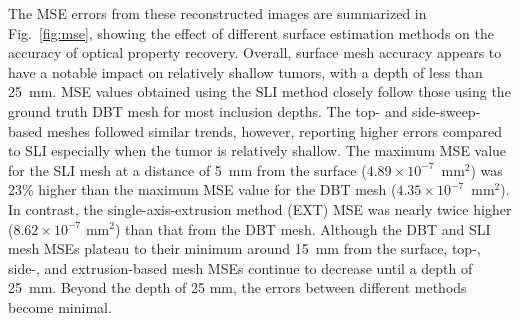 The \ac{MSE} errors from these reconstructed images are summarized in Fig.~\ref{fig:mse}, showing the effect of different surface estimation methods on the accuracy of optical property recovery. Overall, surface mesh accuracy appears to have a notable impact on relatively shallow tumors, with a depth of less than 25~mm. \ac{MSE} values obtained using the \ac{SLI} method closely follow those using the ground truth \ac{DBT} mesh for most inclusion depths. The top- and side-sweep-based meshes followed similar trends, however, reporting higher errors compared to \ac{SLI} especially when the tumor is relatively shallow. The maximum \ac{MSE} value for the \ac{SLI} mesh at a distance of 5~mm from the surface ($4.89\times 10^{-7}$~mm$^2$) was 23\% higher than the maximum \ac{MSE} value for the \ac{DBT} mesh ($4.35\times 10^{-7}$~mm$^2$). In contrast, the single-axis-extrusion method (EXT) \ac{MSE} was nearly twice higher ($8.62\times 10^{-7}$ mm$^2$) than that from the \ac{DBT} mesh. Although the \ac{DBT} and \ac{SLI} mesh \ac{MSE}s plateau to their minimum around 15~mm from the surface, top-, side-, and extrusion-based mesh \ac{MSE}s continue to decrease until a depth of 25~mm. Beyond the depth of 25 mm, the errors between different methods become minimal.

